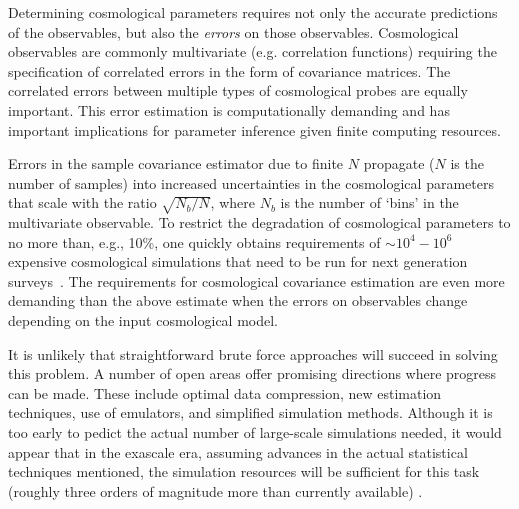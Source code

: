 \medskip


Determining cosmological parameters requires not only the accurate
predictions of the observables, but also the \emph{errors} on those
observables. Cosmological observables are commonly multivariate
(e.g. correlation functions) requiring the specification of correlated
errors in the form of covariance matrices. The correlated errors
between multiple types of cosmological probes are equally
important. This error estimation is computationally demanding and has
important implications for parameter inference given finite computing
resources.

Errors in the sample covariance estimator due to finite $N$ propagate
($N$ is the number of samples) into increased uncertainties in the
cosmological parameters that scale with the ratio $\sqrt{N_b/N}$,
where $N_b$ is the number of `bins' in the multivariate observable. To
restrict the degradation of cosmological parameters to no more than,
e.g., 10\%, one quickly obtains requirements of $\sim10^{4}-10^{6}$
expensive cosmological simulations that need to be run for next
generation surveys~\cite{cov}. The requirements for
cosmological covariance estimation are even more demanding than the
above estimate when the errors on observables change depending on the
input cosmological model.

It is unlikely that straightforward brute force approaches will
succeed in solving this problem. A number of open areas offer
promising directions where progress can be made. These include optimal
data compression, new estimation techniques, use of emulators, and
simplified simulation methods. Although it is too early to pedict the
actual number of large-scale simulations needed, it would appear that
in the exascale era, assuming advances in the actual statistical
techniques mentioned, the simulation resources will be sufficient for
this task (roughly three orders of magnitude more than currently
available) .

\medskip


